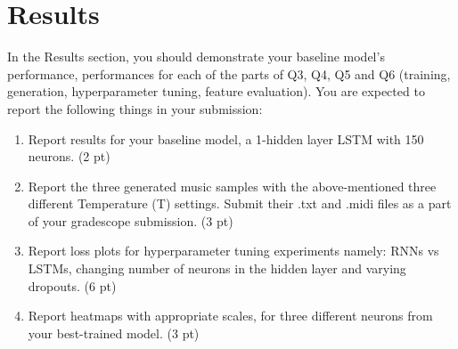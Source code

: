 \section*{Results}
In the Results section, you should demonstrate your baseline model’s performance, performances for each of the parts of Q3, Q4, Q5 and Q6 (training, generation, hyperparameter tuning, feature evaluation).
You are expected to report the following things in your submission:
\begin{enumerate}[label=\alph*)]
  \item Report results for your baseline model, a 1-hidden layer LSTM with 150 neurons. (2 pt)
  \item Report the three generated music samples with the above-mentioned three different Temperature (T) settings. Submit their .txt and .midi files as a part of your gradescope submission. (3 pt)
  \item  Report loss plots for hyperparameter tuning experiments namely: RNNs vs LSTMs, changing number of neurons in the hidden layer and varying dropouts. (6 pt)
  \item Report heatmaps with appropriate scales, for three different neurons from your best-trained model. (3 pt)
\end{enumerate}
